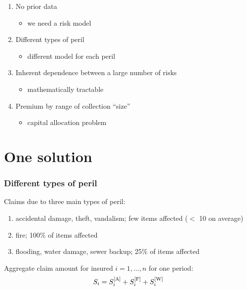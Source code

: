 \begin{frame}[plain]
  \begin{enumerate}
  \item No prior data
    \begin{itemize}
    \item we need a risk model
    \end{itemize}
    \medskip
  \item Different types of peril
    \begin{itemize}
    \item different model for each peril
    \end{itemize}
    \medskip
  \item Inherent dependence between a large number of risks
    \begin{itemize}
    \item mathematically tractable
    \end{itemize}
    \medskip
  \item Premium by range of collection ``size''
    \begin{itemize}
    \item capital allocation problem
    \end{itemize}
  \end{enumerate}
\end{frame}

\section{One solution}

\begin{frame}
  \frametitle{Different types of peril}

  \begin{assumption}
    Claims due to three main types of peril:
    \begin{enumerate}
    \item accidental damage, theft, vandalism; \alert{few} items affected ($<$ 10 on average)
    \item fire; \alert{100\%} of items affected
    \item flooding, water damage, sewer backup; \alert{25\%} of items
      affected
    \end{enumerate}
  \end{assumption}
  \pause

  \begin{consequence}
    Aggregate claim amount for insured $i = 1, \dots, n$ for one period:
    \begin{equation*}
      S_i = S_i^{[\text{A}]} + S_i^{[\text{F}]} + S_i^{[\text{W}]}
    \end{equation*}
  \end{consequence}
\end{frame}

